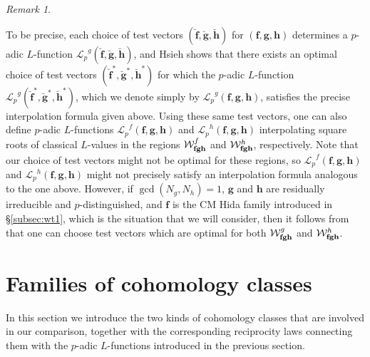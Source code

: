 \documentclass[a4paper,11pt]{amsart}
\theoremstyle{plain}
\theoremstyle{definition}
\theoremstyle{remark}
\newtheorem{remarkwr}[theorem]{Remark}
\newenvironment{remark}{\begin{remarkwr}\begin{upshape}}{\end{upshape}\end{remarkwr}}
\newcommand{\Lp}{{\mathscr{L}_p}}
\newcommand{\hf}{{\mathbf{f}}}
\newcommand{\hg}{{\mathbf{g}}}
\newcommand{\hh}{{\mathbf h}}
\numberwithin{equation}{section}
\begin{document}
\begin{remark}
    To be precise, each choice of test vectors $(\breve{\hf},\breve{\hg},\breve{\hh})$ for $(\hf,\hg,\hh)$ determines a $p$-adic $L$-function $\Lp^g(\breve{\hf},\breve{\hg},\breve{\hh})$, and Hsieh shows that there exists an optimal choice of test vectors $(\breve{\hf}^\ast,\breve{\hg}^\ast,\breve{\hh}^\ast)$ for which the $p$-adic $L$-function $\Lp^g(\breve{\hf}^\ast,\breve{\hg}^\ast,\breve{\hh}^\ast)$, which we denote simply by $\Lp^g(\hf,\hg,\hh)$, satisfies the precise interpolation formula given above. Using these same test vectors, one can also define $p$-adic $L$-functions $\Lp^f(\hf,\hg,\hh)$ and $\Lp^h(\hf,\hg,\hh)$ interpolating square roots of classical $L$-values in the regions $\mathcal W_{{\bf fgh}}^f$ and $\mathcal W_{{\bf fgh}}^h$, respectively. Note that our choice of test vectors might not be optimal for these regions, so $\Lp^f(\hf,\hg,\hh)$ and $\Lp^h(\hf,\hg,\hh)$ might not precisely satisfy an interpolation formula analogous to the one above. However, if $\gcd(N_g,N_h)=1$, $\hg$ and $\hh$ are residually irreducible and $p$-distinguished, and $\hf$ is the CM Hida family introduced in \S\ref{subsec:wt1}, which is the situation that we will consider, then it follows from \cite{Hs} that one can choose test vectors which are optimal for both $\mathcal W_{{\bf fgh}}^g$ and $\mathcal W_{{\bf fgh}}^h$.
\end{remark}




\section{Families of cohomology classes}

In this section we introduce the two kinds of cohomology classes that are involved in our comparison, together with the corresponding reciprocity laws connecting them with the $p$-adic $L$-functions introduced in the previous section.
\end{document}
